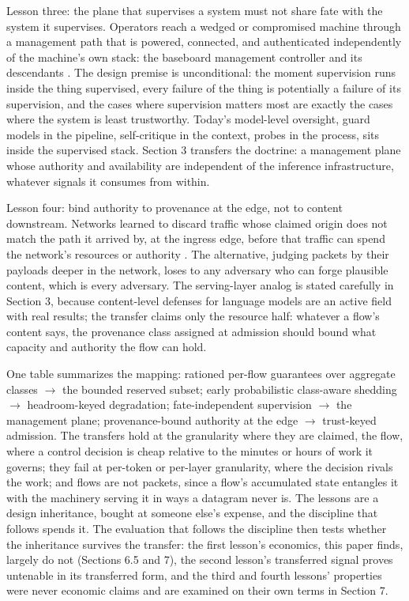 Lesson three: the plane that supervises a system must not share fate with
the system it supervises. Operators reach a wedged or compromised machine
through a management path that is powered, connected, and authenticated
independently of the machine's own stack: the baseboard management
controller and its descendants \citep{ipmi_spec}. The design premise is
unconditional: the moment supervision runs inside the thing supervised,
every failure of the thing is potentially a failure of its supervision,
and the cases where supervision matters most are exactly the cases where
the system is least trustworthy. Today's model-level oversight, guard
models in the pipeline, self-critique in the context, probes in the
process, sits inside the supervised stack. Section 3 transfers the
doctrine: a management plane whose authority and availability are
independent of the inference infrastructure, whatever signals it consumes
from within.

Lesson four: bind authority to provenance at the edge, not to content
downstream. Networks learned to discard traffic whose claimed origin does
not match the path it arrived by, at the ingress edge, before that
traffic can spend the network's resources or authority \citep{rfc2827,rfc3704}. The alternative, judging packets by their payloads deeper in
the network, loses to any adversary who can forge plausible content,
which is every adversary. The serving-layer analog is stated carefully in
Section 3, because content-level defenses for language models are an
active field with real results; the transfer claims only the resource
half: whatever a flow's content says, the provenance class assigned at
admission should bound what capacity and authority the flow can hold.

One table summarizes the mapping: rationed per-flow guarantees over
aggregate classes $\to$ the bounded reserved subset; early probabilistic
class-aware shedding $\to$ headroom-keyed degradation; fate-independent
supervision $\to$ the management plane; provenance-bound authority at the
edge $\to$ trust-keyed admission. The transfers hold at the granularity
where they are claimed, the flow, where a control decision is cheap
relative to the minutes or hours of work it governs; they fail at
per-token or per-layer granularity, where the decision rivals the work;
and flows are not packets, since a flow's accumulated state entangles it
with the machinery serving it in ways a datagram never is. The lessons
are a design inheritance, bought at someone else's expense, and the
discipline that follows spends it. The evaluation that follows the
discipline then tests whether the inheritance survives the transfer: the
first lesson's economics, this paper finds, largely do not (Sections 6.5
and 7), the second lesson's transferred signal proves untenable in its
transferred form, and the third and fourth lessons' properties were
never economic claims and are examined on their own terms in Section 7.

